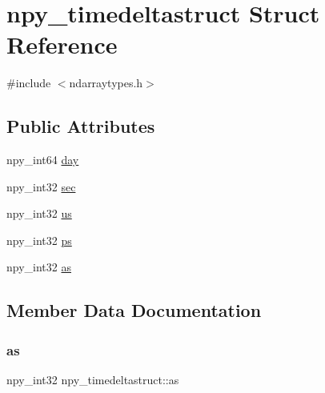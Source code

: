 \hypertarget{structnpy__timedeltastruct}{}\section{npy\+\_\+timedeltastruct Struct Reference}
\label{structnpy__timedeltastruct}


{\ttfamily \#include $<$ndarraytypes.\+h$>$}

\subsection*{Public Attributes}
\begin{DoxyCompactItemize}
\item 
npy\+\_\+int64 \hyperlink{structnpy__timedeltastruct_a3a2b7c5b1bcf64ab0cacf5dd9d256899}{day}
\item 
npy\+\_\+int32 \hyperlink{structnpy__timedeltastruct_a6242f413150d736dccc16155808a32fa}{sec}
\item 
npy\+\_\+int32 \hyperlink{structnpy__timedeltastruct_a46be561563734de4d4c9ab188206d8bd}{us}
\item 
npy\+\_\+int32 \hyperlink{structnpy__timedeltastruct_a34ce3cfa60800b41e16251ce55ef655d}{ps}
\item 
npy\+\_\+int32 \hyperlink{structnpy__timedeltastruct_a2de3615778e1ed4ad852cd84a96669a3}{as}
\end{DoxyCompactItemize}


\subsection{Member Data Documentation}
\mbox{\label{structnpy__timedeltastruct_a2de3615778e1ed4ad852cd84a96669a3}} 
\subsubsection{\texorpdfstring{as}{as}}
{\footnotesize\ttfamily npy\+\_\+int32 npy\+\_\+timedeltastruct\+::as}

\mbox{\label{structnpy__timedeltastruct_a3a2b7c5b1bcf64ab0cacf5dd9d256899}} 

